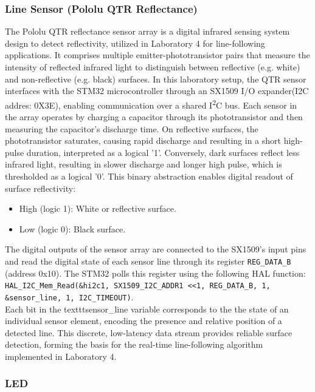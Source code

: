 \subsubsection{Line Sensor (Pololu QTR Reflectance)}
\label{sec:line_sensor}

\noindent
The Pololu QTR reflectance sensor array is a digital infrared sensing system design to detect reflectivity, utilized in Laboratory 4 for line-following applications. It comprises multiple emitter-phototransistor pairs that measure the intensity of reflected infrared light to distinguish between reflective (e.g. white) and non-reflective (e.g. black) surfaces.
In this laboratory setup, the QTR sensor interfaces with the STM32 microcontroller through an SX1509 I/O expander(I2C addres: 0X3E), enabling communication over a shared I\textsuperscript{2}C bus. 
Each sensor in the array operates by charging a capacitor through its phototransistor and then measuring the capacitor's discharge time. On reflective surfaces, the phototransistor saturates, causing rapid discharge and resulting in a short high-pulse duration, interpreted as a logical '1'. Conversely, dark surfaces reflect less infrared light, resulting in slower discharge and longer high pulse, which is thresholded as a logical '0'. This binary abstraction enables digital readout of surface reflectivity:

\begin{itemize}
    \item High (logic 1): White or reflective surface.
    \item Low (logic 0): Black surface.
\end{itemize}


\noindent
The digital outputs of the sensor array are connected to the SX1509's input pins and read the digital state of each sensor line through its register \texttt{REG\_DATA\_B} (address 0x10). The STM32 polls this register using the following HAL function: \\
\texttt{HAL\_I2C\_Mem\_Read(\&hi2c1, SX1509\_I2C\_ADDR1 <<1, REG\_DATA\_B, 1, \&sensor\_line, 1, I2C\_TIMEOUT)}. \\
Each bit in the texttt{sensor\_line} variable corresponds to the the state of an individual sensor element, encoding the presence and relative position of a detected line. This discrete, low-latency data stream provides reliable surface detection, forming the basis for the real-time line-following algorithm implemented in Laboratory 4.


\subsubsection{LED}

